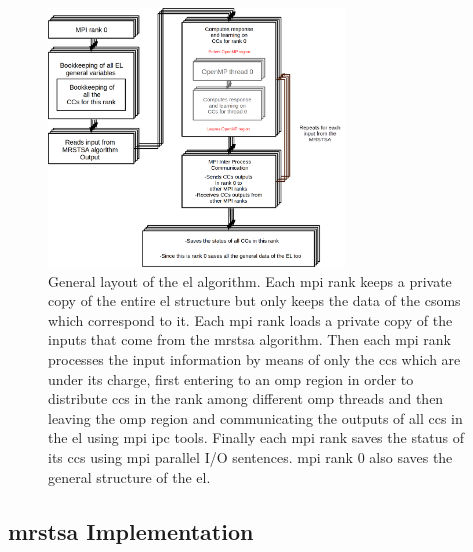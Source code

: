 \documentclass[10pt,journal,compsoc]{IEEEtran}
\begin{document}
\begin{figure}[ht]
    \centering
    \includegraphics[width=0.7\textwidth]{EL_ALG.png}
    \caption{General layout of the \gls{el} algorithm. Each \gls{mpi} rank keeps a private copy of the entire \gls{el} structure but only keeps the data of the \glspl{csom} which correspond to it. Each \gls{mpi} rank loads a private copy of the inputs that come from the \gls{mrstsa} algorithm. Then each \gls{mpi} rank processes the input information by means of only the \glspl{cc} which are under its charge, first entering to an \gls{omp} region in order to distribute \glspl{cc} in the rank among different \gls{omp} threads and then leaving the \gls{omp} region and communicating the outputs of all \glspl{cc} in the \gls{el} using \gls{mpi} \gls{ipc} tools. Finally each \gls{mpi} rank saves the status of its \glspl{cc} using \gls{mpi} parallel I/O sentences. \gls{mpi} rank 0 also saves the general structure of the \gls{el}.} 
    \label{fig:EL_ALG}
\end{figure}














\subsection{\gls{mrstsa} Implementation}
\end{document}
